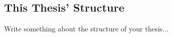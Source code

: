 \subsection{This Thesis' Structure}
\label{sec:motivation}

Write something about the structure of your thesis...